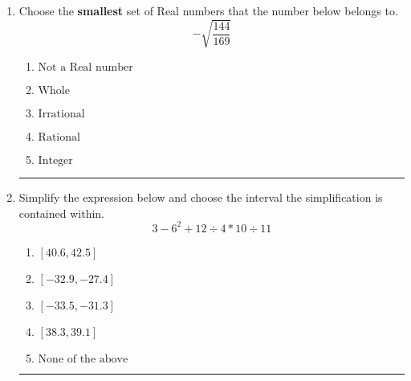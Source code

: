 \documentclass[14pt]{extbook}
\newcommand{\litem}[1]{\item#1\hspace*{-1cm}\rule{\textwidth}{0.4pt}}
\begin{document}
\begin{enumerate}
{\begin{enumerate}[label=\Alph*.]
\end{enumerate} }
\litem{
Choose the \textbf{smallest} set of Real numbers that the number below belongs to.\[ -\sqrt{\frac{144}{169}} \]\begin{enumerate}[label=\Alph*.]
\item \( \text{Not a Real number} \)
\item \( \text{Whole} \)
\item \( \text{Irrational} \)
\item \( \text{Rational} \)
\item \( \text{Integer} \)

\end{enumerate} }
\litem{
Simplify the expression below and choose the interval the simplification is contained within.\[ 3 - 6^2 + 12 \div 4 * 10 \div 11 \]\begin{enumerate}[label=\Alph*.]
\item \( [40.6, 42.5] \)
\item \( [-32.9, -27.4] \)
\item \( [-33.5, -31.3] \)
\item \( [38.3, 39.1] \)
\item \( \text{None of the above} \)

\end{enumerate} }
\end{enumerate}
\end{document}
